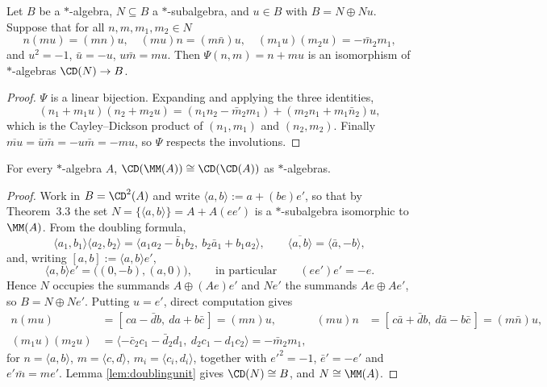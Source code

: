 

\begin{lemma}\label{lem:doublingunit}
Let $B$ be a $*$-algebra, $N\subseteq B$ a $*$-subalgebra, and $u\in B$ with
$B=N\oplus Nu$. Suppose that for all $n,m,m_1,m_2\in N$
\[
  n(mu)=(mn)u,\quad (mu)n=(m\bar n)u,\quad (m_1u)(m_2u)=-\bar m_2m_1,
\]
and $u^2=-1$, $\bar u=-u$, $u\bar m=mu$. Then $\Psi(n,m)=n+mu$ is an isomorphism
of $*$-algebras $\CD(N)\to B$.
\end{lemma}

\begin{proof}
$\Psi$ is a linear bijection. Expanding and applying the three identities,
\[
 (n_1+m_1u)(n_2+m_2u)=(n_1n_2-\bar m_2m_1)+(m_2n_1+m_1\bar n_2)u,
\]
which is the Cayley--Dickson product of $(n_1,m_1)$ and $(n_2,m_2)$. Finally
$\overline{mu}=\bar u\bar m=-u\bar m=-mu$, so $\Psi$ respects the involutions.
\end{proof}

\begin{theorem}[Erasure]\label{thm:erasure}
For every $*$-algebra $A$, $\CD(\MM(A))\cong\CD(\CD(A))$ as $*$-algebras.
\end{theorem}

\begin{proof}
Work in $B=\CD^2(A)$ and write $\langle a,b\rangle:=a+(be)e'$, so that by
Theorem~3.3 the set $N=\{\langle a,b\rangle\}=A+A(ee')$ is a $*$-subalgebra
isomorphic to $\MM(A)$. From the doubling formula,
\[
 \langle a_1,b_1\rangle\langle a_2,b_2\rangle
  =\langle a_1a_2-\bar b_1b_2,\ b_2\bar a_1+b_1a_2\rangle,
 \qquad
 \overline{\langle a,b\rangle}=\langle\bar a,-b\rangle,
\]
and, writing $[a,b]:=\langle a,b\rangle e'$,
\[
 \langle a,b\rangle e'=\bigl((0,-b),(a,0)\bigr),
 \qquad\text{in particular}\qquad (ee')e'=-e .
\]
Hence $N$ occupies the summands $A\oplus(Ae)e'$ and $Ne'$ the summands
$Ae\oplus Ae'$, so $B=N\oplus Ne'$. Putting $u=e'$, direct computation gives
\[
\begin{aligned}
 n(mu)&=[\,ca-\bar db,\ da+b\bar c\,]=(mn)u, &
 (mu)n&=[\,c\bar a+\bar db,\ d\bar a-b\bar c\,]=(m\bar n)u,\\
 (m_1u)(m_2u)&=\langle-\bar c_2c_1-\bar d_2d_1,\ d_2c_1-d_1c_2\rangle=-\bar m_2m_1,
\end{aligned}
\]
for $n=\langle a,b\rangle$, $m=\langle c,d\rangle$, $m_i=\langle c_i,d_i\rangle$,
together with $e'^2=-1$, $\bar e'=-e'$ and $e'\bar m=me'$. Lemma
\ref{lem:doublingunit} gives $\CD(N)\cong B$, and $N\cong\MM(A)$.
\end{proof}

